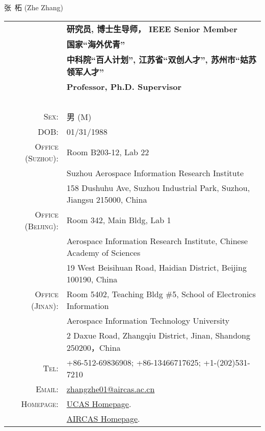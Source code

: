 \documentclass[paper=a4,fontsize=11pt]{scrartcl}
\newcommand{\sepspace}{\vspace*{1em}}		%
\newcommand{\MyName}[1]{
		\Huge \usefont{OT1}{phv}{b}{n} \hfill #1 		%
		\par \normalsize \normalfont}
\newcommand{\MySlogan}[1]{
		\large \usefont{OT1}{phv}{m}{n}\hfill \textit{#1} %
		\par \normalsize \normalfont}
\begin{document}

\MyName{张~柘 (Zhe Zhang)}

\sepspace


\begin{tabular}{rl}
	& \textbf{研究员, 博士生导师， IEEE Senior Member} \\
	& \textbf{国家``海外优青''} \\
	& \textbf{中科院``百人计划'', 江苏省``双创人才'', 苏州市``姑苏领军人才''} \\
	& \textbf{Professor, Ph.D. Supervisor} \\
	~&~\\
\textsc{Sex:} & 男 (M) \\
\textsc{DOB:} & 01/31/1988 \\
\textsc{Office (Suzhou):} &  Room B203-12, Lab 22 \\
	& Suzhou Aerospace Information Research Institute \\
	& 158 Dushuhu Ave, Suzhou Industrial Park, Suzhou, Jiangsu 215000, China \\
\textsc{Office (Beijing):}	&  Room 342, Main Bldg, Lab 1 \\
	& Aerospace Information Research Institute, Chinese Academy of Sciences \\
	& 19 West Beisihuan Road, Haidian District, Beijing 100190, China \\
\textsc{Office (Jinan):}	&  Room 5402, Teaching Bldg \#5, School of Electronics Information \\
	& Aerospace Information Technology University \\
	& 2 Daxue Road, Zhangqiu District, Jinan, Shandong 250200，China \\
\textsc{Tel:} & +86-512-69836908; +86-13466717625; +1-(202)531-7210\\
\textsc{Email:} & \href{mailto:zhangzhe01@aircas.ac.cn}{zhangzhe01@aircas.ac.cn} \\
\textsc{Homepage:} & \href{https://people.ucas.ac.cn/~zhe}{UCAS Homepage}. \\
	& \href{http://www.aircas.ac.cn/sourcedb/cn/expert/yjy/202308/t20230803_6853650.html}{AIRCAS Homepage}.
\end{tabular}
\end{document}
